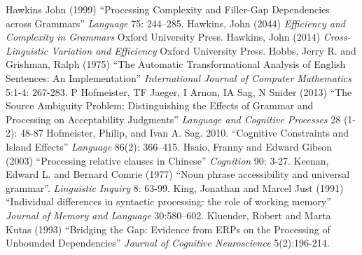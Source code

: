 \documentclass[a4paper]{article}
\begin{document}
\newline
Hawkins John (1999) ``Processing Complexity and Filler-Gap Dependencies across Grammars'' {\it Language} 75:  244–285.
\newline
\newline
Hawkins, John (2044) {\it Efficiency and Complexity in Grammars}  Oxford University Press.
\newline
\newline
Hawkins, John (2014) {\it Cross-Linguistic Variation and Efficiency}  Oxford University Press.
\newline
\newline
Hobbs, Jerry R. and Grishman, Ralph (1975) ``The Automatic Transformational Analysis of English Sentences: An Implementation''  {\it International Journal of Computer Mathematics}
5:1-4: 267-283.
\newline
\newline
P Hofmeister, TF Jaeger, I Arnon, IA Sag, N Snider (2013) ``The Source Ambiguity Problem: Distinguishing the Effects of Grammar and Processing on Acceptability Judgments''
{\it Language and Cognitive Processes} 28 (1-2): 48-87
\newline
\newline
Hofmeister, Philip, and Ivan A. Sag. 2010. ``Cognitive Constraints and Island Effects''
{\it Language}
86(2): 366–415.
\newline
\newline
Hsaio, Franny and Edward Gibson (2003) ``Processing relative clauses in Chinese'' {\it Cognition} 90: 3-27.
\newline
\newline
Keenan, Edward L. and Bernard Comrie (1977) ``Noun phrase accessibility and universal grammar''. {\it Linguistic Inquiry} 8: 63-99.
\newline
\newline
King, Jonathan and Marcel Just  (1991) ``Individual differences in syntactic processing: the role of working memory'' {\it Journal of Memory and Language} 30:580–602.
\newline
\newline
Kluender, Robert and Marta Kutas (1993) ``Bridging the Gap: Evidence from ERPs on the Processing of Unbounded Dependencies'' {\it Journal of Cognitive Neuroscience} 5(2):196-214.
\newline
\end{document}
